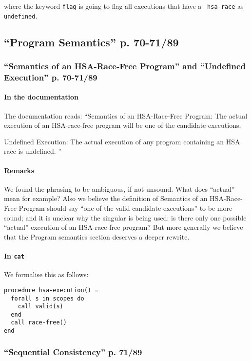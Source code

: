 \documentclass[a4paper]{article}
\begin{document}
where the keyword {\tt flag} is going to flag all executions that have a {\tt
hsa-race} as {\tt undefined}.

\subsection{``Program Semantics'' p. 70-71/89 \label{sec:prog-sem}}

\subsubsection{``Semantics of an HSA-Race-Free Program'' and ``Undefined
Execution'' p. 70-71/89}

\paragraph{In the documentation}
The documentation reads: ``Semantics of an HSA-Race-Free Program: The actual
execution of an HSA-race-free program will be one of the candidate executions.

Undefined Execution: The actual execution of any program containing an HSA race
is undefined.
'' 

\paragraph{Remarks} We found the phrasing to be ambiguous, if not unsound. What
does ``actual'' mean for example? Also we believe the definition of Semantics
of an HSA-Race-Free Program should say ``one of the valid candidate
executions'' to be more sound; and it is unclear why the singular is being
used: is there only one possible ``actual'' execution of an HSA-race-free
program? But more generally we believe that the Program semantics section
deserves a deeper rewrite.

\paragraph{In {\tt cat}}
We formalise this as follows:
\begin{verbatim}
procedure hsa-execution() =
  forall s in scopes do
    call valid(s)
  end
  call race-free()
end
\end{verbatim}

\subsubsection{``Sequential Consistency'' p. 71/89}
\end{document}
